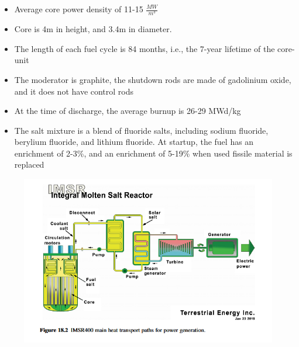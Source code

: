 \documentclass[letterpaper]{article}
\begin{document}
\begin{itemize}
\item Average core power density of 11-15 $\frac{MW}{m^{3}}$
\item Core is 4m in height, and 3.4m in diameter.
\item The length of each fuel cycle is 84 months, i.e., the 7-year lifetime of the core-unit
\item The moderator is graphite, the shutdown rods are made of gadolinium oxide, and it does not have control rods
\item At the time of discharge, the average burnup is 26-29 MWd/kg
\item The salt mixture is a blend of fluoride salts, including sodium fluoride, berylium fluoride, and lithium fluoride.  At startup, the fuel has an enrichment of 2-3\%, and an enrichment of 5-19\% when used fissile material is replaced
\end{itemize}

\begin{figure}[H]
  \centering
  \includegraphics[width=1.0\linewidth]{figures/IMSRsource1.png}
  \label{fig:fig8}
\end{figure}
\end{document}

